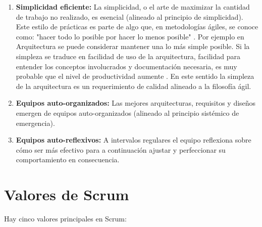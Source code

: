 \begin{enumerate}
\item \textbf{Simplicidad eficiente:} La simplicidad, o el arte de maximizar la cantidad de trabajo no realizado, es esencial (alineado al principio de simplicidad). Este estilo de prácticas es parte de algo que, en metodologías ágiles, se conoce como: "hacer todo lo posible por hacer lo menos posible" \cite{Anacleto-2005}. Por ejemplo en Arquitectura se puede considerar mantener una lo más simple posible. Si la simpleza se traduce en facilidad de uso de la arquitectura, facilidad para entender los conceptos involucrados y documentación necesaria, es muy probable que el nivel de productividad aumente \cite{Anacleto-2005}. En este sentido la simpleza de la arquitectura es un requerimiento de calidad alineado a la filosofía ágil.

\item \textbf{Equipos auto-organizados:} Las mejores arquitecturas, requisitos y diseños emergen de equipos auto-organizados (alineado al principio sistémico de emergencia).

\item \textbf{Equipos auto-reflexivos:} A intervalos regulares el equipo reflexiona sobre cómo ser más efectivo para a continuación ajustar y perfeccionar su comportamiento en consecuencia.

\end{enumerate}

\section{Valores de Scrum}

Hay cinco valores principales en Scrum:

